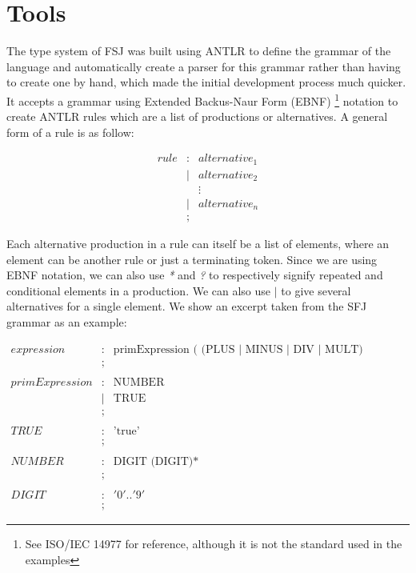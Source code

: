 \documentclass{l4proj}
\begin{document}
\section{Tools}

The type system of FSJ was built using ANTLR \citep{parr2013} to define the grammar of the language and automatically create a parser for this grammar rather than having to create one by hand, which made the initial development process much quicker.
It accepts a grammar using Extended Backus-Naur Form (EBNF) \footnote{See ISO/IEC 14977 for reference, although it is not the standard used in the examples} notation to create ANTLR rules which are a list of productions or alternatives.
A general form of a rule is as follow:

$$
    \begin{array}{llll}
        rule & : & alternative_{1}
        \\
             & | & alternative_{2}
        \\
             &   & \vdots
        \\
             & | & alternative_{n}
        \\
             & ; &
    \end{array}
$$

Each alternative production in a rule can itself be a list of elements, where an element can be another rule or just a terminating token.
Since we are using EBNF notation, we can also use \emph{*} and \emph{?} to respectively signify repeated and conditional elements in a production.
We can also use $|$ to give several alternatives for a single element.
We show an excerpt taken from the SFJ grammar as an example:

$$
    \begin{array}{llll}
        expression     & : & \mbox{primExpression ( (PLUS | MINUS | DIV | MULT) primExpression)?}
        \\
                       & ;
        \\
        \\
        primExpression & : & \mbox{NUMBER}
        \\
                       & | & \mbox{TRUE}
        \\
                       & ; &
        \\
        \\
        TRUE           & : & \mbox{'true'}
        \\
                       & ; &
        \\
        \\
        NUMBER         & : & \mbox{DIGIT (DIGIT)*}
        \\
                       & ; &
        \\
        \\
        DIGIT          & : & '0'..'9'
        \\
                       & ; &
    \end{array}
$$
\end{document}
